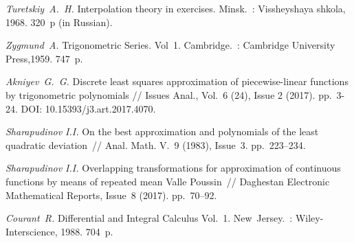 \begin{thebibliography}{111}
\textit{Turetskiy~A.~H.} Interpolation theory in exercises. Minsk.~: Vissheyshaya shkola, 1968. 320~p (in Russian).

\textit{Zygmund~A.} Trigonometric Series. Vol~1. Cambridge.~: 
Cambridge University Press,1959. 747~p.	

\textit{Akniyev~G.~G.} Discrete least squares approximation of piecewise-linear functions by trigonometric polynomials // Issues Anal., Vol.~6 (24), Issue 2 (2017). pp.~3-24. DOI: 10.15393/j3.art.2017.4070.

\textit{Sharapudinov I.I.} On the best approximation and polynomials of the least quadratic deviation~// Anal. Math. V.~9 (1983), Issue~3. pp.~223--234. 

\textit{Sharapudinov I.I.} Overlapping transformations for approximation of continuous functions by means of repeated mean Valle Poussin~// Daghestan Electronic Mathematical Reports, Issue~8 (2017). pp.~70--92. 


\textit{Courant~R.} Differential and Integral Calculus Vol.~1. New~Jersey.~: 
Wiley-Interscience, 1988. 704~p.

\end{thebibliography}
